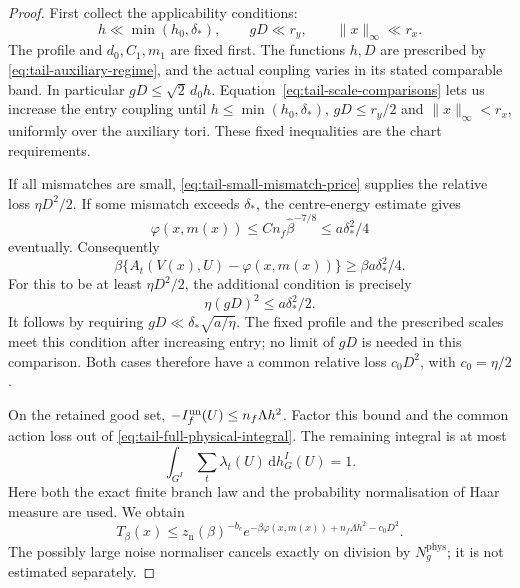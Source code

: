 \documentclass[11pt,reqno]{amsart}
\numberwithin{equation}{section}
\theoremstyle{definition}
\theoremstyle{remark}
\newcommand{\dd}{\mathrm d}
\begin{document}
\begin{proof}
First collect the applicability conditions:
\[
 h\ll\min(h_0,\delta_*),\qquad
 gD\ll r_y,\qquad \|x\|_\infty\ll r_x.
\]
The profile and \(d_0,C_1,m_1\) are fixed first. The functions
\(h,D\) are prescribed by \eqref{eq:tail-auxiliary-regime},
and the actual coupling varies in its stated comparable band.
In particular \(gD\le\sqrt2\,d_0h\).
Equation~\eqref{eq:tail-scale-comparisons} lets us increase the
entry coupling until
\(h\le\min(h_0,\delta_*)\), \(gD\le r_y/2\) and
\(\|x\|_\infty<r_x\), uniformly over the auxiliary tori.
These fixed inequalities are the chart requirements.

If all mismatches are small,
\eqref{eq:tail-small-mismatch-price} supplies the relative
loss \(\eta D^2/2\). If some mismatch exceeds
\(\delta_*\), the centre-energy estimate gives
\[
       \varphi(x,m(x))
           \le C n_f\widehat\beta^{-7/8}
           \le a\delta_*^2/4
\]
eventually. Consequently
\[
       \beta\{A_t(V(x),U)-\varphi(x,m(x))\}
                               \ge\beta a\delta_*^2/4.
\]
For this to be at least \(\eta D^2/2\), the additional
condition is precisely
\[
                    \eta(gD)^2\le a\delta_*^2/2.
\]
It follows by requiring \(gD\ll\delta_*\sqrt{a/\eta}\).
The fixed profile and the prescribed scales meet this
condition after increasing entry; no limit of \(gD\)
is needed in this comparison.
Both cases therefore have a common relative loss
\(c_0D^2\), with \(c_0=\eta/2\).

On the retained good set,
\(-I_f^{\rm un}(U)\le n_f\Lambda h^2\).
Factor this bound and the common action loss out of
\eqref{eq:tail-full-physical-integral}. The remaining
integral is at most
\[
       \int_{G^I}\sum_t\lambda_t(U)\,\dd h_G^I(U)=1.
\]
Here both the exact finite branch law and the probability
normalisation of Haar measure are used. We obtain
\begin{equation}
       T_\beta(x)\le z_{\mathrm n}(\beta)^{-b_c}
          e^{-\beta\varphi(x,m(x))+n_f\Lambda h^2-c_0D^2}.
 \label{eq:tail-before-normalisation}
\end{equation}
The possibly large noise normaliser cancels exactly on
division by \(N_g^{\mathrm{phys}}\); it is not estimated separately.


\end{proof}
\end{document}

